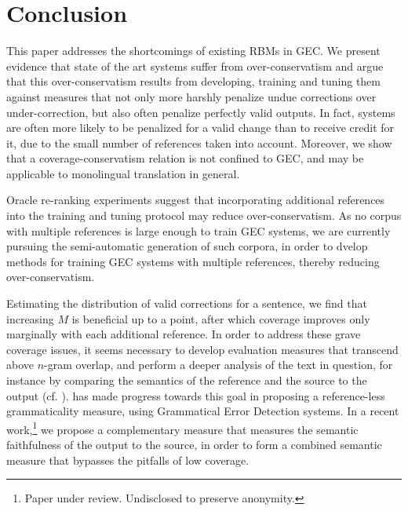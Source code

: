 \documentclass[letterpaper, 11pt]{article}
\begin{document}
\section{Conclusion}\label{sec:conclusion}

This paper addresses the shortcomings of existing RBMs in GEC.
We present evidence that state of the art systems suffer from over-conservatism and
argue that this over-conservatism results from developing, training and tuning them against measures that
not only more harshly penalize undue corrections over under-correction,
but also often penalize perfectly valid outputs.
In fact, systems are often more likely to be penalized for a valid change than 
to receive credit for it, due to the small number of references taken into account.
Moreover, we show that a coverage-conservatism relation is not confined to
GEC, and may be applicable to monolingual translation in general.

Oracle re-ranking experiments suggest that incorporating additional references into the training and tuning protocol may reduce over-conservatism. 
As no corpus with multiple references is large enough to train GEC systems,
we are currently pursuing the semi-automatic generation of such corpora, in order to dvelop methods
for training GEC systems with multiple references, thereby reducing over-conservatism.

Estimating the distribution of valid corrections for a sentence, we find
that increasing $M$ is beneficial up to a point, after which
coverage improves only marginally with each additional reference.
In order to address these grave coverage issues, it seems necessary to
develop evaluation measures that transcend above $n$-gram overlap, and
perform a deeper analysis of the text in question, for instance by comparing
the semantics of the reference and the source to the output (cf. \cite{lo2011meant}).
has made progress towards this goal in proposing a reference-less grammaticality measure,
using Grammatical Error Detection systems.
In a recent work,\footnote{Paper under review. Undisclosed to preserve anonymity.} we propose a complementary measure that measures the semantic faithfulness of the output to the source, in order to form a combined semantic measure that bypasses the pitfalls of low coverage.
\end{document}
